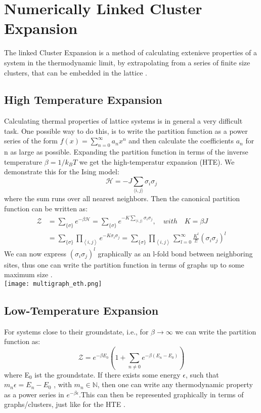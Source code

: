\documentclass{article}
\begin{document}
\section{Numerically Linked Cluster Expansion}
The linked Cluster Expansion is a method of calculating extenisve properties of
a system in the thermodynamic limit, by extrapolating
from a series of finite size clusters, that can be embedded in the
lattice \cite{Rigol,Series,Domb}.\\
\subsection{High Temperature Expansion}

Calculating thermal properties of lattice systems is in general a
very difficult task. One possible way to do this, is to write the
partition function as a power series of the form $f(x) =
\sum_{n=0}^{\infty} a_nx^n$ and then calculate the coefficients $a_n$
for n as large as possible. Expanding the partition function in terms
of the inverse temperature $\beta =
1/k_BT$ we get the high-temperatur expansion (HTE).
We demonstrate this for the Ising model:
\begin{equation}
\label{eq:10}
\mathcal{H} = -J \sum\limits_{\langle i,j \rangle} \sigma_i \sigma_j
\end{equation}
where the sum runs over all nearest neighbors. Then the canonical
partition function can be written as:
\begin{align}
\label{eq:11}
\mathcal{Z} &= \sum\limits_{\{ \sigma \}} e^{-\beta \mathcal{H}} =
\sum\limits_{\{ \sigma \}} e^{-K \sum_{\langle i,j \rangle}
  \sigma_i \sigma_j}, \quad with \quad K = \beta J\\
&= \sum\limits_{\{ \sigma \}} \prod\limits_{\left\langle i,j
  \right\rangle} e^{-K \sigma_i \sigma_j} =  \sum\limits_{\{ \sigma \}} \prod\limits_{\left\langle i,j
  \right\rangle} \sum\limits_{l = 0}^{\infty} \frac{K^l}{l!}(\sigma_i
  \sigma_j )^l
\end{align}
We can now express $(\sigma_i \sigma_j)^l$ graphically as an l-fold
bond between neighboring sites, thus one can write the partition
function in terms of graphs up to some maximum size \cite{Rigol,Series}.\\

\texttt{[image: multigraph\_eth.png]}
\subsection{Low-Temperature Expansion}
For systems close to their groundstate, i.e., for $\beta \to \infty$
we can write the partition function as:
\begin{equation}
\label{eq:12}
\mathcal{Z} = e^{-\beta E_0} \left( 1 + \sum\limits_{n \neq 0}
  e^{-\beta (E_n - E_0)} \right)
\end{equation}
where E$_0$ ist the groundstate. If there exists some energy
$\epsilon$, such that $m_n \epsilon = E_n - E_0$ , with $m_n \in
\mathbb{N}$, then one can write any thermodynamic property as a power
series in $e^{-\beta \epsilon}$.This can then be represented
graphically in terms of  graphs/clusters, just like for the HTE \cite{Rigol,Series}.
\end{document}
